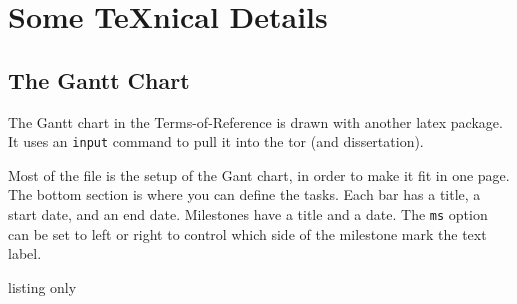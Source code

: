 
\chapter{Some TeXnical Details}

\section{The Gantt Chart}
The Gantt chart in the Terms-of-Reference is drawn with another latex package.
It uses an \texttt{input} command to pull it into the tor (and dissertation).

Most of the file  is the setup of the Gant chart, in order to make it fit in one page.  The bottom section is where you can define the tasks.
Each bar has a title, a start date, and an end date.  Milestones have a title and a date.  The \texttt{ms} option can be set to left or right to control which side of the milestone mark the text label.

\begin{tcblisting}{listing only}
 \\
 \\
 \\
%
\end{tcblisting}
